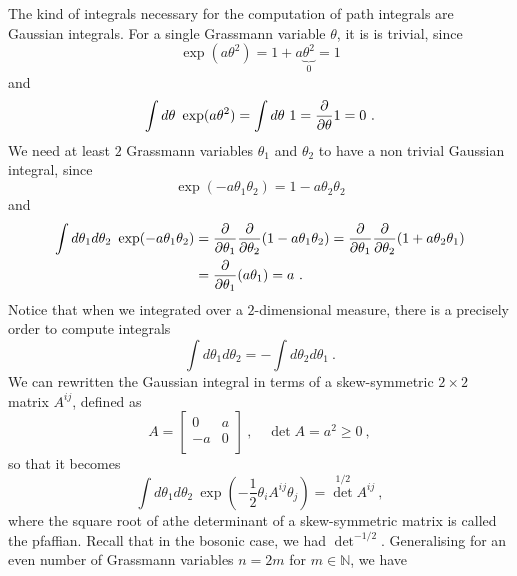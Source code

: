    The kind of integrals necessary for the computation of path integrals are Gaussian integrals. For a single Grassmann variable $\theta$, it is is trivial, since 
    \begin{equation*}
        \exp(a \theta^2) = 1 + a \underbrace{\theta^2}_0 = 1 
    \end{equation*}
    and
    \begin{equation*}
        \int d\theta ~ \exp(a \theta^2) = \int d\theta ~ 1 = \frac{\partial}{\partial\theta} 1 = 0 ~.
    \end{equation*}
    We need at least $2$ Grassmann variables $\theta_1$ and $\theta_2$ to have a non trivial Gaussian integral, since 
    \begin{equation*}
        \exp(- a \theta_1 \theta_2) = 1 - a \theta_2 \theta_2 
    \end{equation*}
    and 
    \begin{equation*}
    \begin{aligned}
        \int d\theta_1 d \theta_2 ~ \exp(- a \theta_1 \theta_2) & = \frac{\partial}{\partial\theta_1} \frac{\partial}{\partial\theta_2} (1 - a \theta_1 \theta_2) = \frac{\partial}{\partial\theta_1} \frac{\partial}{\partial\theta_2} (1 + a \theta_2 \theta_1 ) \\ & = \frac{\partial}{\partial\theta_1} (a \theta_1) = a ~.
    \end{aligned}
    \end{equation*}
    Notice that when we integrated over a $2$-dimensional measure, there is a precisely order to compute integrals 
    \begin{equation*}
        \int d \theta_1 d \theta_2 = - \int d\theta_2 d \theta_1 ~. 
    \end{equation*}
    We can rewritten the Gaussian integral in terms of a skew-symmetric $2 \times 2$ matrix $A^{ij}$, defined as 
    \begin{equation*}
        A = \begin{bmatrix}
            0 & a \\ -a & 0 \\
        \end{bmatrix} ~, \quad \det A = a^2 \geq 0 ~,
    \end{equation*}
    so that it becomes 
    \begin{equation*}
        \int d\theta_1 d \theta_2 ~ \exp(- \frac{1}{2} \theta_i A^{ij} \theta_j) = {\det}^{1/2} A^{ij} ~,
    \end{equation*}
    where the square root of athe determinant of a skew-symmetric matrix is called the pfaffian. Recall that in the bosonic case, we had $\det^{- 1/2}$. Generalising for an even number of Grassmann variables $n = 2m$ for $m \in \mathbb N$, we have 
